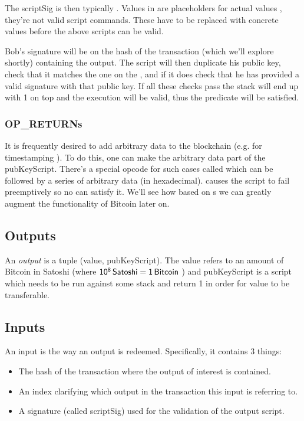 The \textsf{scriptSig} is then typically . Values in \code{<>} are placeholders for actual values , they're  not valid script commands. These have to be replaced with concrete values before the above scripts can be valid.

Bob's signature will be on the hash of the transaction (which we'll explore shortly) containing the output. The script will then duplicate his public key, check that it matches the one on the , and if it does check that he has provided a valid signature with that public key. If all these checks pass the stack will end up with 1 on top and the execution will be valid, thus the predicate will be satisfied.


\subsubsection{OP\_RETURNs}
It is frequently desired to add arbitrary data to the blockchain (e.g. for timestamping ). To do this, one can make  the arbitrary data part of the \textsf{pubKeyScript}. There's a special opcode for such cases called  which can be followed by a series of arbitrary data (in hexadecimal).  causes the script to fail preemptively so no  can satisfy it. We'll see how based on s we can greatly augment the functionality of Bitcoin later on.

\subsection{Outputs}
An \emph{output} is a tuple ({\sf value, pubKeyScript}). The \textsf{value} refers to an amount of Bitcoin in Satoshi (where $\sf 10^8 \, Satoshi = 1 \, Bitcoin$ ) and \textsf{pubKeyScript} is a script which needs to be run against some stack and return 1 in order for \textsf{value} to be transferable.

\subsection{Inputs}
An input is the way an output is redeemed. Specifically, it contains 3 things:
\begin{itemize}
  \item The hash of the transaction where the output of interest is contained.
  \item An index clarifying which output in the transaction this input is referring to.
  \item A signature (called \textsf{scriptSig}) used for the validation of the output script.
\end{itemize}

